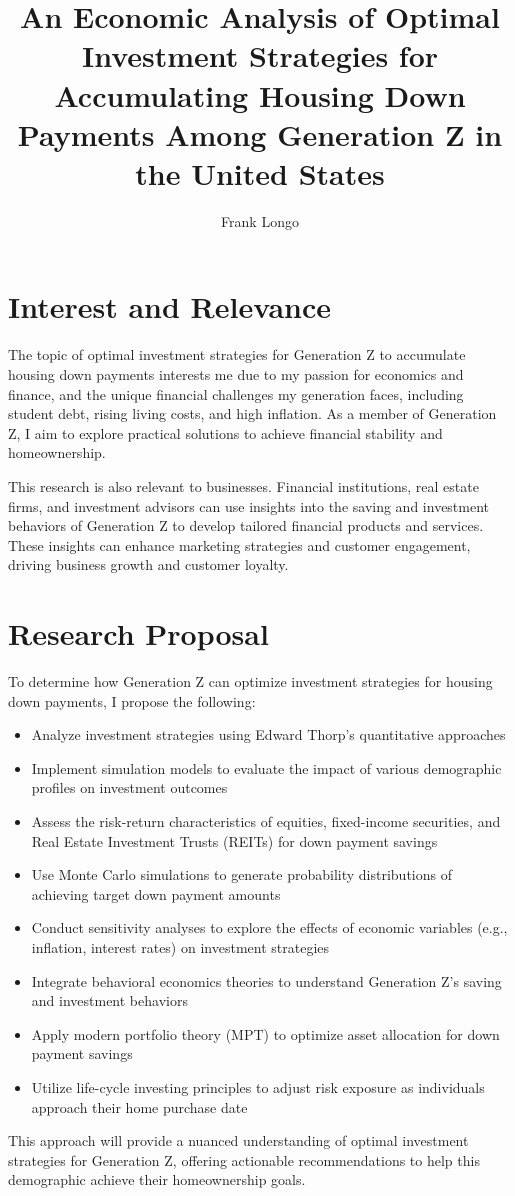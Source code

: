 \documentclass{article}
\title{\large An Economic Analysis of Optimal Investment Strategies for Accumulating Housing Down Payments Among Generation Z in the United States}
\author{Frank Longo}
\begin{document}
\doublespacing
\maketitle

\section*{Interest and Relevance}

The topic of optimal investment strategies for Generation Z to accumulate housing down payments interests me due to my passion for economics and finance, and the unique financial challenges my generation faces, including student debt, rising living costs, and high inflation. As a member of Generation Z, I aim to explore practical solutions to achieve financial stability and homeownership.

This research is also relevant to businesses. Financial institutions, real estate firms, and investment advisors can use insights into the saving and investment behaviors of Generation Z to develop tailored financial products and services. These insights can enhance marketing strategies and customer engagement, driving business growth and customer loyalty.

\section*{Research Proposal}

To determine how Generation Z can optimize investment strategies for housing down payments, I propose the following:

\begin{itemize}
\item Analyze investment strategies using Edward Thorp's quantitative approaches
\item Implement simulation models to evaluate the impact of various demographic profiles on investment outcomes
\item Assess the risk-return characteristics of equities, fixed-income securities, and Real Estate Investment Trusts (REITs) for down payment savings
\item Use Monte Carlo simulations to generate probability distributions of achieving target down payment amounts
\item Conduct sensitivity analyses to explore the effects of economic variables (e.g., inflation, interest rates) on investment strategies
\item Integrate behavioral economics theories to understand Generation Z's saving and investment behaviors
\item Apply modern portfolio theory (MPT) to optimize asset allocation for down payment savings
\item Utilize life-cycle investing principles to adjust risk exposure as individuals approach their home purchase date
\end{itemize}

This approach will provide a nuanced understanding of optimal investment strategies for Generation Z, offering actionable recommendations to help this demographic achieve their homeownership goals.
\end{document}
